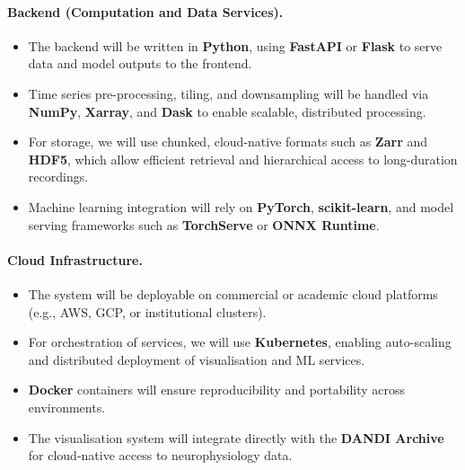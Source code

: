 \paragraph{Backend (Computation and Data Services).}
\begin{itemize}
          \item The backend will be written in \textbf{Python}, using
              \textbf{FastAPI} or \textbf{Flask} to serve data and model
              outputs to the frontend.
                \item Time series pre-processing, tiling, and downsampling will
                    be handled via \textbf{NumPy}, \textbf{Xarray}, and
                    \textbf{Dask} to enable scalable, distributed processing.
                      \item For storage, we will use chunked, cloud-native
                          formats such as \textbf{Zarr} and \textbf{HDF5},
                          which allow efficient retrieval and hierarchical
                          access to long-duration recordings.
                            \item Machine learning integration will rely on
                                \textbf{PyTorch}, \textbf{scikit-learn}, and
                                model serving frameworks such as
                                \textbf{TorchServe} or \textbf{ONNX Runtime}.
\end{itemize}

\paragraph{Cloud Infrastructure.}
\begin{itemize}
          \item The system will be deployable on commercial or academic cloud
              platforms (e.g., AWS, GCP, or institutional clusters).
                \item For orchestration of services, we will use
                    \textbf{Kubernetes}, enabling auto-scaling and distributed
                    deployment of visualisation and ML services.
                      \item \textbf{Docker} containers will ensure
                          reproducibility and portability across environments.
                            \item The visualisation system will integrate
                                directly with the \textbf{DANDI Archive} for
                                cloud-native access to neurophysiology data.
\end{itemize}

